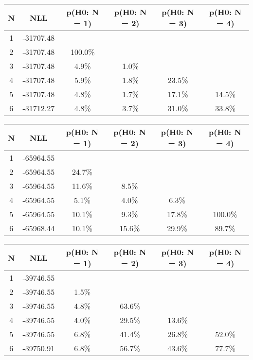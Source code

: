 \begin{table}[h!]
	\centering
	\begin{tabular}{cc||cccc}
		N & NLL & p(H0: N = 1) & p(H0: N = 2) & p(H0: N = 3) & p(H0: N = 4)\\ 
		\hline
1 & -31707.48 & & & & \\
2 & -31707.48 & 100.0\% & & & \\
3 & -31707.48 & 4.9\% & 1.0\% & & \\
4 & -31707.48 & 5.9\% & 1.8\% & 23.5\% & \\
5 & -31707.48 & 4.8\% & 1.7\% & 17.1\% & 14.5\% \\
6 & -31712.27 & 4.8\% & 3.7\% & 31.0\% & 33.8\% \\
	\end{tabular}
	\label{tab:lab}
\end{table}

\begin{table}[h!]
	\centering
	\begin{tabular}{cc||cccc}
		N & NLL & p(H0: N = 1) & p(H0: N = 2) & p(H0: N = 3) & p(H0: N = 4)\\ 
		\hline
1 & -65964.55 & & & & \\
2 & -65964.55 & 24.7\% & & & \\
3 & -65964.55 & 11.6\% & 8.5\% & & \\
4 & -65964.55 & 5.1\% & 4.0\% & 6.3\% & \\
5 & -65964.55 & 10.1\% & 9.3\% & 17.8\% & 100.0\% \\
6 & -65968.44 & 10.1\% & 15.6\% & 29.9\% & 89.7\% \\
	\end{tabular}
	\label{tab:lab}
\end{table}

\begin{table}[h!]
	\centering
	\begin{tabular}{cc||cccc}
		N & NLL & p(H0: N = 1) & p(H0: N = 2) & p(H0: N = 3) & p(H0: N = 4)\\ 
		\hline
1 & -39746.55 & & & & \\
2 & -39746.55 & 1.5\% & & & \\
3 & -39746.55 & 4.8\% & 63.6\% & & \\
4 & -39746.55 & 4.0\% & 29.5\% & 13.6\% & \\
5 & -39746.55 & 6.8\% & 41.4\% & 26.8\% & 52.0\% \\
6 & -39750.91 & 6.8\% & 56.7\% & 43.6\% & 77.7\% \\
	\end{tabular}
	\label{tab:lab}
\end{table}

